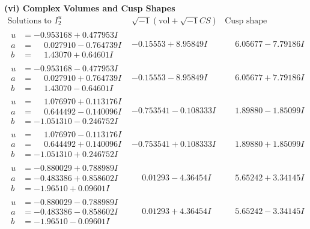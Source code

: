 \documentclass[1p]{elsarticle_modified}
\theoremstyle{definition}
\newcommand{\I}{\sqrt{-1}}
\begin{document}
\newpage\flushleft \textbf{(vi) Complex Volumes and Cusp Shapes}
$$\begin{array}{c|c|c}  
\text{Solutions to }I^u_{2}& \I (\text{vol} + \sqrt{-1}CS) & \text{Cusp shape}\\
 \hline 
\begin{aligned}
u &= -0.953168 + 0.477953 I \\
a &= \phantom{-}0.027910 - 0.764739 I \\
b &= \phantom{-}1.43070 + 0.64601 I\end{aligned}
 & -0.15553 + 8.95849 I & \phantom{-}6.05677 - 7.79186 I \\ \hline\begin{aligned}
u &= -0.953168 - 0.477953 I \\
a &= \phantom{-}0.027910 + 0.764739 I \\
b &= \phantom{-}1.43070 - 0.64601 I\end{aligned}
 & -0.15553 - 8.95849 I & \phantom{-}6.05677 + 7.79186 I \\ \hline\begin{aligned}
u &= \phantom{-}1.076970 + 0.113176 I \\
a &= \phantom{-}0.644492 - 0.140096 I \\
b &= -1.051310 - 0.246752 I\end{aligned}
 & -0.753541 - 0.108333 I & \phantom{-}1.89880 - 1.85099 I \\ \hline\begin{aligned}
u &= \phantom{-}1.076970 - 0.113176 I \\
a &= \phantom{-}0.644492 + 0.140096 I \\
b &= -1.051310 + 0.246752 I\end{aligned}
 & -0.753541 + 0.108333 I & \phantom{-}1.89880 + 1.85099 I \\ \hline\begin{aligned}
u &= -0.880029 + 0.788989 I \\
a &= -0.483386 + 0.858602 I \\
b &= -1.96510 + 0.09601 I\end{aligned}
 & \phantom{-}0.01293 - 4.36454 I & \phantom{-}5.65242 + 3.34145 I \\ \hline\begin{aligned}
u &= -0.880029 - 0.788989 I \\
a &= -0.483386 - 0.858602 I \\
b &= -1.96510 - 0.09601 I\end{aligned}
 & \phantom{-}0.01293 + 4.36454 I & \phantom{-}5.65242 - 3.34145 I \\ \hline\begin{aligned}

\end{aligned}
\end{array}$$
\end{document}
